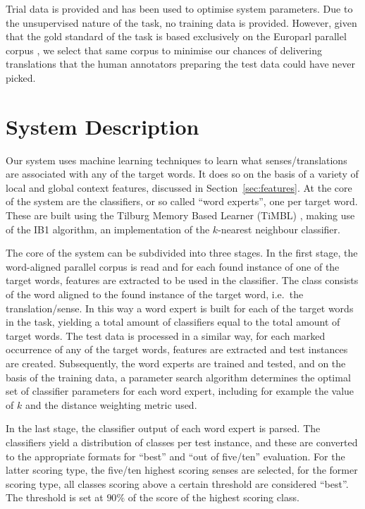 Trial data is provided and has been used to optimise system
parameters. Due to the unsupervised nature of the task, no training data is
provided. However, given that the gold standard of the task is based
exclusively on the Europarl parallel corpus \citep{EUROPARL}, we select that
same corpus to minimise our chances of delivering translations that the human
annotators preparing the test data could have never picked.

\section{System Description}

Our system uses machine learning techniques to learn what
senses/translations are associated with any of the target words. It does so on
the basis of a variety of local and global context features, discussed in
Section~\ref{sec:features}. At the core of the system are the classifiers, or
so called ``word experts'', one per target word. These are built using the
Tilburg Memory Based Learner (TiMBL) \citep{TIMBL}, making use of the IB1
algorithm, an implementation of the $k$-nearest neighbour classifier.

The core of the system can be subdivided into three stages. In the
first stage, the word-aligned parallel corpus is read and for each found
instance of one of the target words, features are extracted to be used in the
classifier. The class consists of the word aligned to the found instance of the
target word, i.e.\ the translation/sense. In this way a word expert is built for
each of the target words in the task, yielding a total amount of classifiers
equal to the total amount of target words. The test data is processed in a
similar way, for each marked occurrence of any of the target words, features
are extracted and test instances are created. Subsequently, the word experts
are trained and tested, and on the basis of the training data, a parameter
search algorithm \citep{PARAMSEARCH} determines the optimal set of classifier
parameters for each word expert, including for example the value of $k$ and the
distance weighting metric used.

In the last stage, the classifier output of each word expert is parsed. The
classifiers yield a distribution of classes per test instance, and these are
converted to the appropriate formats for ``best'' and ``out of five/ten''
evaluation. For the latter scoring type, the five/ten highest scoring senses
are selected, for the former scoring type, all classes scoring above a certain
threshold are considered ``best''. The threshold is set at $90\%$ of the score
of the highest scoring class.

